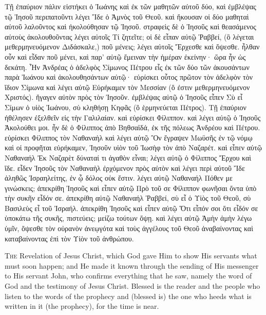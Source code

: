 \begin{pages}
\begin{Rightside}
	 	Τῇ ἐπαύριον πάλιν εἱστήκει ὁ Ἰωάνης καὶ ἐκ τῶν μαθητῶν αὐτοῦ δύο, καὶ ἐμβλέψας τῷ Ἰησοῦ περιπατοῦντι λέγει Ἴδε ὁ Ἀμνὸς τοῦ Θεοῦ. καὶ ἤκουσαν οἱ δύο μαθηταὶ αὐτοῦ λαλοῦντος καὶ ἠκολούθησαν τῷ Ἰησοῦ. στραφεὶς δὲ ὁ Ἰησοῦς καὶ θεασάμενος αὐτοὺς ἀκολουθοῦντας λέγει αὐτοῖς Τί ζητεῖτε; οἱ δὲ εἶπαν αὐτῷ Ῥαββεί, (ὃ λέγεται μεθερμηνευόμενον Διδάσκαλε,) ποῦ μένεις; λέγει αὐτοῖς Ἔρχεσθε καὶ ὄψεσθε. ἦλθαν οὖν καὶ εἶδαν ποῦ μένει, καὶ παρ’ αὐτῷ ἔμειναν τὴν ἡμέραν ἐκείνην· ὥρα ἦν ὡς δεκάτη. Ἦν Ἀνδρέας ὁ ἀδελφὸς Σίμωνος Πέτρου εἷς ἐκ τῶν δύο τῶν ἀκουσάντων παρὰ Ἰωάνου καὶ ἀκολουθησάντων αὐτῷ· εὑρίσκει οὗτος πρῶτον τὸν ἀδελφὸν τὸν ἴδιον Σίμωνα καὶ λέγει αὐτῷ Εὑρήκαμεν τὸν Μεσσίαν (ὅ ἐστιν μεθερμηνευόμενον Χριστός). ἤγαγεν αὐτὸν πρὸς τὸν Ἰησοῦν. ἐμβλέψας αὐτῷ ὁ Ἰησοῦς εἶπεν Σὺ εἶ Σίμων ὁ υἱὸς Ἰωάνου, σὺ κληθήσῃ Κηφᾶς (ὃ ἑρμηνεύεται Πέτρος). Τῇ ἐπαύριον ἠθέλησεν ἐξελθεῖν εἰς τὴν Γαλιλαίαν. καὶ εὑρίσκει Φίλιππον. καὶ λέγει αὐτῷ ὁ Ἰησοῦς Ἀκολούθει μοι. ἦν δὲ ὁ Φίλιππος ἀπὸ Βηθσαϊδά, ἐκ τῆς πόλεως Ἀνδρέου καὶ Πέτρου. εὑρίσκει Φίλιππος τὸν Ναθαναὴλ καὶ λέγει αὐτῷ Ὃν ἔγραψεν Μωϋσῆς ἐν τῷ νόμῳ καὶ οἱ προφῆται εὑρήκαμεν, Ἰησοῦν υἱὸν τοῦ Ἰωσὴφ τὸν ἀπὸ Ναζαρέτ. καὶ εἶπεν αὐτῷ Ναθαναήλ Ἐκ Ναζαρὲτ δύναταί τι ἀγαθὸν εἶναι; λέγει αὐτῷ ὁ Φίλιππος Ἔρχου καὶ ἴδε. εἶδεν Ἰησοῦς τὸν Ναθαναὴλ ἐρχόμενον πρὸς αὐτὸν καὶ λέγει περὶ αὐτοῦ Ἴδε ἀληθῶς Ἰσραηλείτης, ἐν ᾧ δόλος οὐκ ἔστιν. λέγει αὐτῷ Ναθαναήλ Πόθεν με γινώσκεις; ἀπεκρίθη Ἰησοῦς καὶ εἶπεν αὐτῷ Πρὸ τοῦ σε Φίλιππον φωνῆσαι ὄντα ὑπὸ τὴν συκῆν εἶδόν σε. ἀπεκρίθη αὐτῷ Ναθαναήλ Ῥαββεί, σὺ εἶ ὁ Υἱὸς τοῦ Θεοῦ, σὺ Βασιλεὺς εἶ τοῦ Ἰσραήλ. ἀπεκρίθη Ἰησοῦς καὶ εἶπεν αὐτῷ Ὅτι εἶπόν σοι ὅτι εἶδόν σε ὑποκάτω τῆς συκῆς, πιστεύεις; μείζω τούτων ὄψῃ. καὶ λέγει αὐτῷ Ἀμὴν ἀμὴν λέγω ὑμῖν, ὄψεσθε τὸν οὐρανὸν ἀνεῳγότα καὶ τοὺς ἀγγέλους τοῦ Θεοῦ ἀναβαίνοντας καὶ καταβαίνοντας ἐπὶ τὸν Υἱὸν τοῦ ἀνθρώπου.
		\pend
        \endnumbering
    \end{Rightside}
    \begin{Leftside}
        \beginnumbering
        		\renewcommand\LettrineFontHook{\Zallmanfamily}
			\lettrine[lines=3]{T}{he} Revelation of Jesus Christ, which God gave Him to show His servants what must soon happen; and He made it known through the sending of His messenger to His servant John, who confirms everything that he saw, namely the word of God and the testimony of Jesus Christ. Blessed is the reader and the people who listen to the words of the prophecy and (blessed is) the one who heeds what is written in it (the prophecy), for the time is near.
		\pend
		\pstart
		\pend
		\pstart
		\pend
        \endnumbering
    \end{Leftside}

\end{pages} 
\Pages

